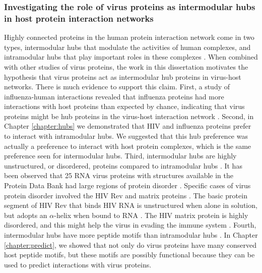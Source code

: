 \subsubsection{Investigating the role of virus proteins as intermodular hubs in host protein interaction networks}

Highly connected proteins in the human protein interaction network
come in two types, intermodular hubs that modulate the activities of
human complexes, and intramodular hubs that play important roles in
these complexes \cite{han04,taylor09}. When combined with other
studies of virus proteins, the work in this dissertation motivates the
hypothesis that virus proteins act as intermodular hub proteins in
virus-host networks. There is much evidence to support this
claim. First, a study of influenza-human interactions revealed that
influenza proteins had more interactions with host proteins than
expected by chance, indicating that virus proteins might be hub
proteins in the virus-host interaction network
\cite{shapira2009physical}. Second, in Chapter \ref{chapter:hubs} we
demonstrated that HIV and influenza proteins prefer to interact with
intramodular hubs. We suggested that this hub preference was actually
a preference to interact with host protein complexes, which is the
same preference seen for intermodular hubs. Third, intermodular hubs
are highly unstructured, or disordered, proteins compared to
intramodular hubs \cite{ekman2006properties,singh2007role}. It has
been observed that 25 RNA virus proteins with structures available in
the Protein Data Bank \cite{berman02} had large regions of protein
disorder \cite{tokuriki2009viral}. Specific cases of virus protein
disorder involved the HIV Rev and matrix proteins
\cite{turner1999structural,goh2008protein}. The basic protein segment
of HIV Rev that binds HIV RNA is unstructured when alone in solution,
but adopts an $\alpha$-helix when bound to RNA
\cite{turner1999structural}. The HIV matrix protein is highly
disordered, and this might help the virus in evading the immune system
\cite{goh2008protein}. Fourth, intermodular hubs have more peptide
motifs than intramodular hubs \cite{taylor09}. In Chapter
\ref{chapter:predict}, we showed that not only do virus proteins have
many conserved host peptide motifs, but these motifs are possibly
functional because they can be used to predict interactions with virus
proteins.

